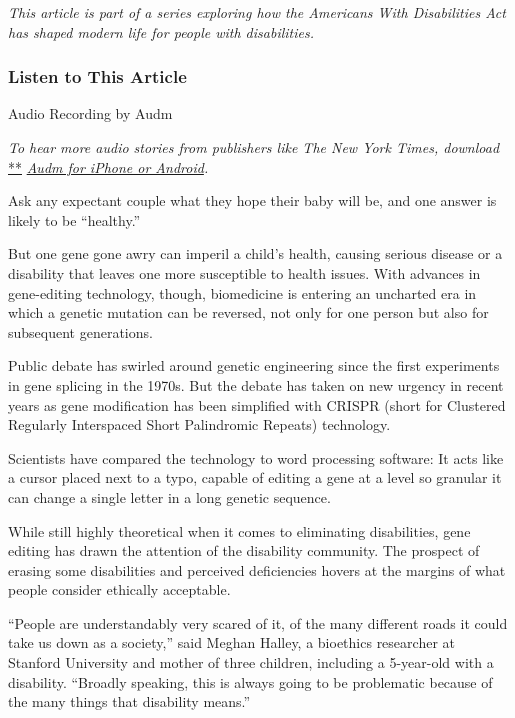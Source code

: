 \emph{This article is part of a series exploring how the Americans With
Disabilities Act has shaped modern life for people with disabilities.}

\hypertarget{listen-to-this-article}{%
\subsubsection{Listen to This Article}\label{listen-to-this-article}}

Audio Recording by Audm

\emph{To hear more audio stories from publishers like The New York
Times, download}
\href{https://www.audm.com/?utm_source=nytmag\&utm_medium=embed\&utm_campaign=left_behind_draper}{**}
\href{https://www.audm.com/?utm_source=nyt\&utm_medium=embed\&utm_campaign=gene_editing_reality}{\emph{Audm
for iPhone or Android}}\emph{.}

Ask any expectant couple what they hope their baby will be, and one
answer is likely to be ``healthy.''

But one gene gone awry can imperil a child's health, causing serious
disease or a disability that leaves one more susceptible to health
issues. With advances in gene-editing technology, though, biomedicine is
entering an uncharted era in which a genetic mutation can be reversed,
not only for one person but also for subsequent generations.

Public debate has swirled around genetic engineering since the first
experiments in gene splicing in the 1970s. But the debate has taken on
new urgency in recent years as gene modification has been simplified
with CRISPR (short for Clustered Regularly Interspaced Short Palindromic
Repeats) technology.

Scientists have compared the technology to word processing software: It
acts like a cursor placed next to a typo, capable of editing a gene at a
level so granular it can change a single letter in a long genetic
sequence.

While still highly theoretical when it comes to eliminating
disabilities, gene editing has drawn the attention of the disability
community. The prospect of erasing some disabilities and perceived
deficiencies hovers at the margins of what people consider ethically
acceptable.

``People are understandably very scared of it, of the many different
roads it could take us down as a society,'' said Meghan Halley, a
bioethics researcher at Stanford University and mother of three
children, including a 5-year-old with a disability. ``Broadly speaking,
this is always going to be problematic because of the many things that
disability means.''

